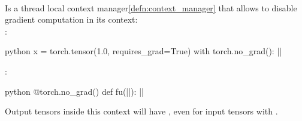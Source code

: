 \begin{defnbox}\nospacing
    \begin{defn}[No Grad]\label{defn:no_grad}\leavevmode\\
        Is a thread local context manager\cref{defn:context_manager} that allows to disable gradient computation in its context:\\
        :
        \begin{mintlinebox}{python}
        x = torch.tensor(1.0, requires_grad=True)
        with torch.no_grad():
            |\texttt{}|
        \end{mintlinebox}
        :
        \begin{mintlinebox}{python}
        @torch.no_grad()
        def fu(|\texttt{}|):
            |\texttt{}|
        \end{mintlinebox}
    \end{defn}
\end{defnbox}
\begin{notebox}[Note]\nospacing
    Output tensors inside this context will have , even for input tensors with .
\end{notebox}
